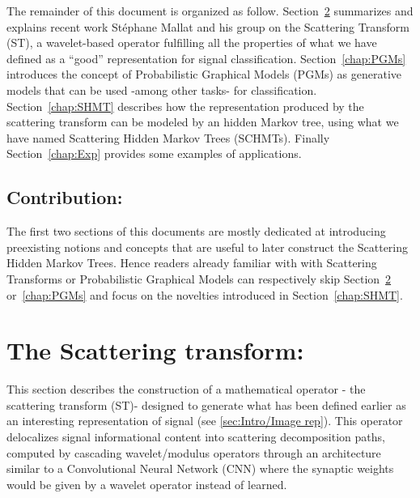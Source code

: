\documentclass[a4paper,11pt]{report}
\begin{document}
    The remainder of this document is organized as follow. Section~\ref{chap:ST} summarizes and explains recent work St\'ephane Mallat and his group on the Scattering Transform (ST), a wavelet-based operator fulfilling all the properties of what we have defined as a ``good'' representation for signal classification. Section~\ref{chap:PGMs} introduces the concept of Probabilistic Graphical Models (PGMs) as generative models that can be used -among other tasks- for classification. Section~\ref{chap:SHMT} describes how the representation produced by the scattering transform can be modeled by an hidden Markov tree, using what we have named Scattering Hidden Markov Trees (SCHMTs). Finally Section~\ref{chap:Exp} provides some examples of applications.
    
	\section{Contribution:}
    \label{sec:Intro/Contrib}    
    
    The first two sections of this documents are mostly dedicated at introducing preexisting notions and concepts that are useful to later construct the Scattering Hidden Markov Trees. Hence readers already familiar with with Scattering Transforms or Probabilistic Graphical Models can respectively skip Section~\ref{chap:ST} or~\ref{chap:PGMs} and focus on the novelties introduced in Section~\ref{chap:SHMT}.

    
\chapter{The Scattering transform:}
  \label{chap:ST}
  
	This section describes the construction of a mathematical operator - the scattering transform (ST)- designed to generate what has been defined earlier as an interesting representation of signal (see \ref{sec:Intro/Image rep}). This operator delocalizes signal informational content into scattering decomposition paths, computed by cascading wavelet/modulus operators through an architecture similar to a Convolutional Neural Network (CNN) where the synaptic weights would be given by a wavelet operator instead of learned.\\ 
	
\end{document}
